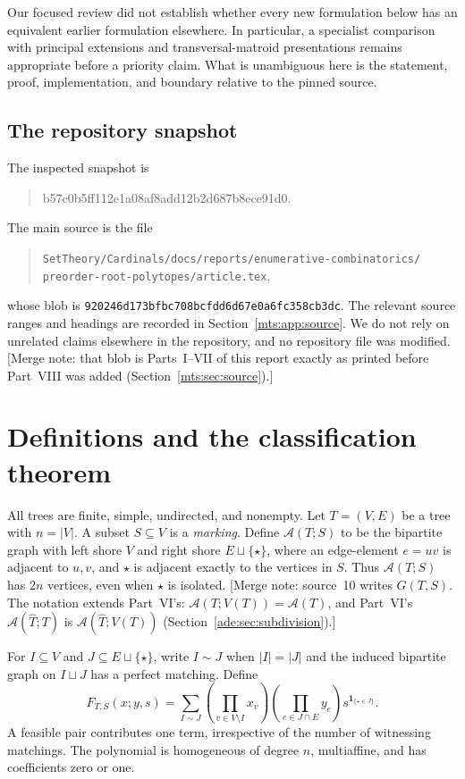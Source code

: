 \documentclass[11pt]{article}
\numberwithin{equation}{section}
\theoremstyle{definition}
\newcommand{\ind}{\mathbf 1}
\newcommand{\calA}{\mathcal A}
\begin{document}
Our focused review did not establish whether every new formulation below
has an equivalent earlier formulation elsewhere. In particular, a
specialist comparison with principal extensions and transversal-matroid
presentations remains appropriate before a priority claim. What is
unambiguous here is the statement, proof, implementation, and boundary
relative to the pinned source.

\subsection{The repository snapshot}

The inspected snapshot is
\begin{quote}\small\ttfamily
b57c0b5ff112e1a08af8add12b2d687b8ece91d0.
\end{quote}
The main source is the file
\begin{quote}\small
\nolinkurl{SetTheory/Cardinals/docs/reports/enumerative-combinatorics/}\newline
\nolinkurl{preorder-root-polytopes/article.tex},
\end{quote}
whose blob is
\texttt{920246d173bfbc708bcfdd6d67e0a6fc358cb3dc}.
The relevant source ranges and headings are recorded in
Section~\ref{mts:app:source}. We do not rely on unrelated claims elsewhere in the
repository, and no repository file was modified.
[Merge note: that blob is Parts~I--VII of this report exactly as printed
before Part~VIII was added (Section~\ref{mts:sec:source}).]

\section{Definitions and the classification theorem}\label{mts:sec:main}

All trees are finite, simple, undirected, and nonempty. Let $T=(V,E)$ be a
tree with $n=|V|$. A subset $S\subseteq V$ is a \emph{marking}. Define
$\calA(T;S)$ to be the bipartite graph with left shore $V$ and right shore
$E\sqcup\{\star\}$, where an edge-element $e=uv$ is adjacent to $u,v$, and
$\star$ is adjacent exactly to the vertices in $S$. Thus $\calA(T;S)$ has $2n$
vertices, even when $\star$ is isolated.
[Merge note: source~10 writes $G(T,S)$. The notation extends Part~VI's:
$\calA(T;V(T))=\calA(T)$, and Part~VI's $\calA(\widehat T;T)$ is
$\calA(\widehat T;V(T))$ (Section~\ref{ade:sec:subdivision}).]

For $I\subseteq V$ and $J\subseteq E\sqcup\{\star\}$, write $I\sim J$ when
$|I|=|J|$ and the induced bipartite graph on $I\sqcup J$ has a perfect
matching. Define
\begin{equation}
 F_{T,S}(x;y,s)=\sum_{I\sim J}
 \left(\prod_{v\in V\setminus I}x_v\right)
 \left(\prod_{e\in J\cap E}y_e\right)
 s^{\ind_{\{\star\in J\}}}.
 \label{mts:eq:F}
\end{equation}
A feasible pair contributes one term, irrespective of the number of
witnessing matchings. The polynomial is homogeneous of degree $n$,
multiaffine, and has coefficients zero or one.
\end{document}

